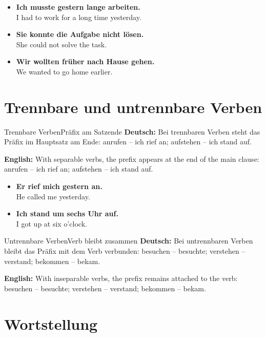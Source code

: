 \documentclass[a4paper,11pt]{article}
\newcommand{\GermanText}[1]{\textbf{Deutsch: }#1\par}
\newcommand{\EnglishText}[1]{{\small\color{SoftGray}\textbf{English: }#1\par}}
\newcommand{\ExampleItem}[2]{\item \textbf{#1}\\{\small\color{SoftGray}#2}}
\begin{document}
        \begin{exbox}
            \begin{itemize}
                \ExampleItem{Ich musste gestern lange arbeiten.}{I had to work for a long time yesterday.}
                \ExampleItem{Sie konnte die Aufgabe nicht lösen.}{She could not solve the task.}
                \ExampleItem{Wir wollten früher nach Hause gehen.}{We wanted to go home earlier.}
            \end{itemize}
        \end{exbox}
    
    
    \section{Trennbare und untrennbare Verben}
        
        \begin{grammarentry}{Trennbare Verben}{Präfix am Satzende}
            \GermanText{Bei trennbaren Verben steht das Präfix im Hauptsatz am Ende: anrufen -- ich rief an; aufstehen -- ich stand auf.}
            \EnglishText{With separable verbs, the prefix appears at the end of the main clause: anrufen -- ich rief an; aufstehen -- ich stand auf.}
        \end{grammarentry}
        
        \begin{exbox}
            \begin{itemize}
                \ExampleItem{Er rief mich gestern an.}{He called me yesterday.}
                \ExampleItem{Ich stand um sechs Uhr auf.}{I got up at six o'clock.}
            \end{itemize}
        \end{exbox}
        
        \begin{grammarentry}{Untrennbare Verben}{Verb bleibt zusammen}
            \GermanText{Bei untrennbaren Verben bleibt das Präfix mit dem Verb verbunden: besuchen -- besuchte; verstehen -- verstand; bekommen -- bekam.}
            \EnglishText{With inseparable verbs, the prefix remains attached to the verb: besuchen -- besuchte; verstehen -- verstand; bekommen -- bekam.}
        \end{grammarentry}
    
    
    \section{Wortstellung}
        
\end{document}

